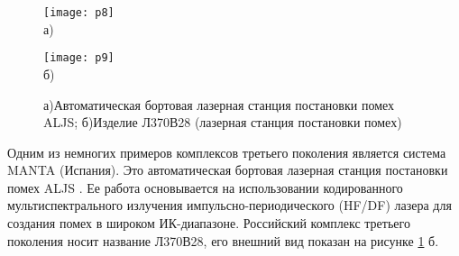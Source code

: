 
\begin{figure}[ht]
	\begin{minipage}[b][][b]{0.49\linewidth}\centering
		\texttt{[image: p8]} \\ а)
	\end{minipage}
	\hfill
	\begin{minipage}[b][][b]{0.49\linewidth}\centering
		\texttt{[image: p9]} \\ б)
	\end{minipage}

	\caption{а)Автоматическая бортовая лазерная станция постановки помех ALJS; б)Изделие Л370В28 (лазерная станция постановки помех)}
	\label{fig:p8-9}
\end{figure}


Одним из немногих примеров комплексов третьего поколения является система MANTA (Испания). Это автоматическая бортовая лазерная станция постановки помех ALJS \cite[]{manta}.
Ее работа основывается на использовании кодированного мультиспектрального излучения импульсно-периодического (HF/DF) лазера для создания помех в широком ИК-диапазоне.
Российский комплекс третьего поколения носит название Л370В28, его внешний вид показан на рисунке \ref{fig:p8-9} б. 


